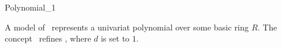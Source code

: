 \begin{ccRefConcept}{Polynomial_1}

\ccDefinition

A model of \ccRefName\ represents a univariat polynomial over some basic ring 
$R$. The concept \ccRefName\ refines , where $d$ is set to $1$.

\ccRefines

\\

\ccSeeAlso 

\\
\\
\\

\ccHasModels

\end{ccRefConcept}